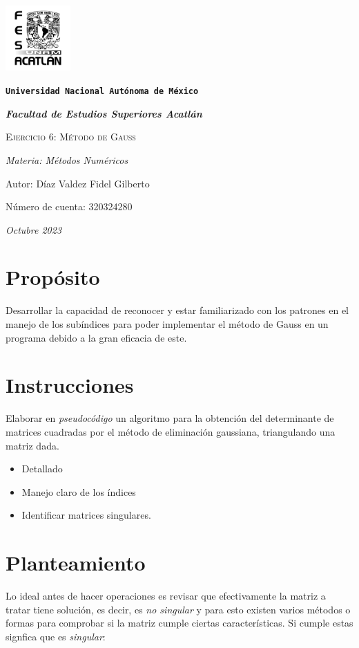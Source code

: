 \documentclass{article}
\begin{document}
\begin{titlepage}
    \centering
 
 
  {\includegraphics[width=2.5cm]{logo.png}\par}
  {\texttt{\bfseries \LARGE Universidad Nacional Autónoma de México} \par}
  \vspace{1cm}
  {\itshape \Large \bfseries Facultad de Estudios Superiores Acatlán \par}
  \vspace{3cm}
  {\scshape \Huge Ejercicio 6: Método de Gauss \par}
  \vspace {3cm}
  {\slshape \Large Materia: Métodos Numéricos \par}
  \vspace{2cm}
  {\Large Autor: Díaz Valdez Fidel Gilberto\par}
  {\Large Número de cuenta: 320324280\par}
  \vfill
  {\itshape Octubre 2023 \par}
\end{titlepage}


\section{Propósito}
Desarrollar la capacidad de reconocer y estar familiarizado con los patrones
en el manejo de los subíndices para poder implementar el método de Gauss en
un programa debido a la gran eficacia de este.


\section{Instrucciones}
Elaborar en \emph{pseudocódigo} un algoritmo para la obtención del determinante
de matrices cuadradas por el método de eliminación gaussiana, triangulando una
matriz dada.
\begin{itemize}
  \item Detallado
  \item Manejo claro de los índices
  \item Identificar matrices singulares.
\end{itemize}


\section{Planteamiento}
Lo ideal antes de hacer operaciones es revisar que efectivamente la matriz a
tratar tiene solución, es decir, es \emph{no singular} y para esto existen
varios métodos o formas para comprobar si la matriz cumple ciertas características.
Si cumple estas signfica que es \emph{singular}:
\end{document}
